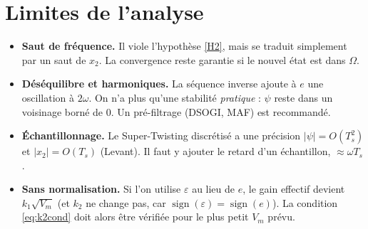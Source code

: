 \documentclass[11pt,a4paper]{article}
\numberwithin{equation}{section}
\theoremstyle{plain}
\theoremstyle{definition}
\theoremstyle{remark}
\newcommand{\sign}{\operatorname{sign}}
\begin{document}
\section{Limites de l'analyse}
\begin{itemize}
  \item \textbf{Saut de fréquence.} Il viole l'hypothèse \ref{H2}, mais se traduit simplement par
        un saut de $x_2$. La convergence reste garantie si le nouvel état est dans $\Omega$.
  \item \textbf{Déséquilibre et harmoniques.} La séquence inverse ajoute à $e$ une oscillation à $2\omega$.
        On n'a plus qu'une stabilité \emph{pratique} : $\psi$ reste dans un voisinage borné de 0.
        Un pré-filtrage (DSOGI, MAF) est recommandé.
  \item \textbf{Échantillonnage.} Le Super-Twisting discrétisé a une précision $|\psi|=O(T_s^2)$
        et $|x_2|=O(T_s)$ (Levant). Il faut y ajouter le retard d'un échantillon, $\approx\omega T_s$.
  \item \textbf{Sans normalisation.} Si l'on utilise $\varepsilon$ au lieu de $e$, le gain effectif devient
        $k_1\sqrt{V_m}$ (et $k_2$ ne change pas, car $\sign(\varepsilon)=\sign(e)$). La condition
        \eqref{eq:k2cond} doit alors être vérifiée pour le plus petit $V_m$ prévu.
\end{itemize}

\end{document}
